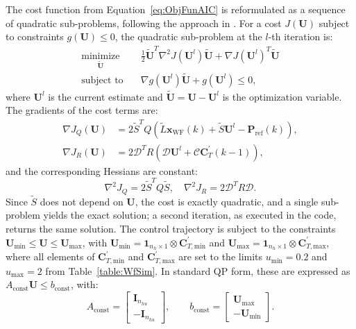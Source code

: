 The cost function from Equation~\eqref{eq:ObjFunAIC} is reformulated as a sequence of quadratic sub-problems, following the approach in \cite{gonzalez2020nonlinear}. For a cost $J(\bm{U})$ subject to constraints $g(\bm{U}) \leq 0$, the quadratic sub-problem at the $l$-th iteration is:
\begin{equation} \label{eq:ObjFunAICapprox}
    \begin{aligned}
        \underset{ \tilde{\bm{U}}} {\text{minimize}} \quad & \frac{1}{2}\tilde{\bm{U}}^T \nabla^2 J(\bm{U}^l) \tilde{\bm{U}} + \nabla J(\bm{U}^l)^T \tilde{\bm{U}} \\
        \text{subject to} \quad & \nabla g(\bm{U}^l) \tilde{\bm{U}} + g(\bm{U}^l) \leq 0,
    \end{aligned}
\end{equation}
where $\bm{U}^l$ is the current estimate and $\tilde{\bm{U}} = \bm{U} - \bm{U}^l$ is the optimization variable. The gradients of the cost terms are:
\begin{align*}
    \nabla J_Q (\bm{U}) &= 2 \tilde{S}^T Q \left( \tilde{L} \bm{x}_{\text{WF}}(k) + \tilde{S} \bm{U}^l - \bm{P}_{\text{ref}}(k) \right), \\
    \nabla J_R(\bm{U}) &= 2 \bm{\mathcal{D}}^T R \left(\bm{\mathcal{D}} \bm{U}^l + \bm{\mathcal{C}} \bm{C}_T^\prime(k-1)\right),
\end{align*}
and the corresponding Hessians are constant:
\begin{equation*}
    \nabla^2 J_Q = 2 \tilde{S}^T Q \tilde{S}, \quad \nabla^2 J_R = 2 \bm{\mathcal{D}}^T R \bm{\mathcal{D}}.
\end{equation*}
Since $\tilde{S}$ does not depend on $\bm{U}$, the cost is exactly quadratic, and a single sub-problem yields the exact solution; a second iteration, as executed in the code, returns the same solution.
%
The control trajectory is subject to the constraints $\bm{U}_{\min} \leq \bm{U} \leq \bm{U}_{\max}$, with $\bm{U}_{\min} = \bm{1}_{n_h \times 1} \otimes \bm{C}_{T,\text{min}}^\prime$ and $\bm{U}_{\max} = \bm{1}_{n_h \times 1} \otimes \bm{C}_{T,\text{max}}^\prime$, where all elements of $\bm{C}_{T,\text{min}}^\prime$ and $\bm{C}_{T,\text{max}}^\prime$ are set to the limits $u_{\min} = 0.2$ and $u_{\max} = 2$ from Table~\ref{table:WfSim}. In standard QP form, these are expressed as $A_{\text{const}} \bm{U} \leq b_{\text{const}}$, with:
\[
A_{\text{const}} = \begin{bmatrix} \bm{I}_{n_{hu}} \\ -\bm{I}_{n_{hu}} \end{bmatrix}, \qquad b_{\text{const}} = \begin{bmatrix} \bm{U}_{\max} \\ -\bm{U}_{\min} \end{bmatrix}.
\]
